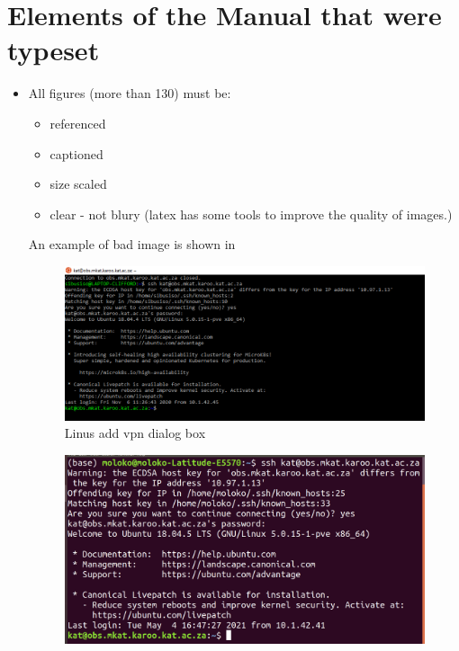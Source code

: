 \documentclass[30pt]{report}
\begin{document}
{\begin{itemize}
   
\end{itemize}
   
\section*{Elements of the Manual that were typeset}

\begin{itemize} 
\item All figures (more than 130) must be:	
\begin{itemize} 
	\item referenced 
	\item captioned
	\item size scaled 
	\item clear - not blury (latex has some tools to improve the quality of images.) 
\end{itemize}
\clearpage

An example of bad image is shown in 
\begin{figure}[H]
	\centering
	\includegraphics[scale=0.43]{image87.png}
	
	\caption{Linus add vpn dialog box}
	\label{fig:image87}
\end{figure}
\begin{figure}[H]
	\centering
	\includegraphics[scale=0.33]{terminal.png}
	

\end{figure}
\end{itemize}}
\end{document}
